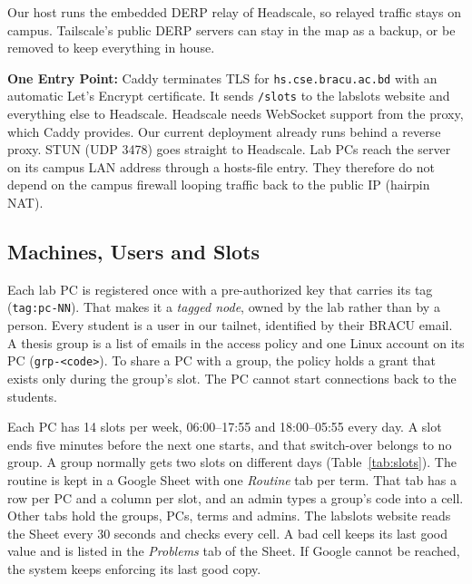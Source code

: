\documentclass[11pt,a4paper]{article}
\newcommand{\code}[1]{\texttt{#1}}
\begin{document}
Our host runs the embedded DERP relay of Headscale, so relayed traffic stays on
campus. Tailscale's public DERP servers can stay in the map as a backup, or be
removed to keep everything in house.

\textbf{One Entry Point:} Caddy terminates TLS for \code{hs.cse.bracu.ac.bd} with
an automatic Let's Encrypt certificate. It sends \code{/slots} to the labslots
website and everything else to Headscale. Headscale needs WebSocket support from
the proxy, which Caddy provides. Our current deployment already runs behind a
reverse proxy. STUN (UDP 3478) goes straight to Headscale. Lab PCs reach the
server on its campus LAN address through a hosts-file entry. They therefore do
not depend on the campus firewall looping traffic back to the public IP (hairpin
NAT).

\subsection{Machines, Users and Slots}

Each lab PC is registered once with a pre-authorized key that carries its tag
(\code{tag:pc-NN}). That makes it a \emph{tagged node}, owned by the lab rather
than by a person. Every student is a user in our tailnet, identified by their
BRACU email. A thesis group is a list of emails in the access policy and one
Linux account on its PC (\code{grp-<code>}). To share a PC with a group, the
policy holds a grant that exists only during the group's slot. The PC cannot
start connections back to the students.

Each PC has 14 slots per week, 06:00--17:55 and 18:00--05:55 every day. A slot
ends five minutes before the next one starts, and that switch-over belongs to no
group. A group normally gets two slots on different days (Table~\ref{tab:slots}).
The routine is kept in a Google Sheet with one \emph{Routine} tab per term. That
tab has a row per PC and a column per slot, and an admin types a group's code
into a cell. Other tabs hold the groups, PCs, terms and admins. The labslots
website reads the Sheet every 30 seconds and checks every cell. A bad cell keeps
its last good value and is listed in the \emph{Problems} tab of the Sheet. If
Google cannot be reached, the system keeps enforcing its last good copy.
\end{document}
